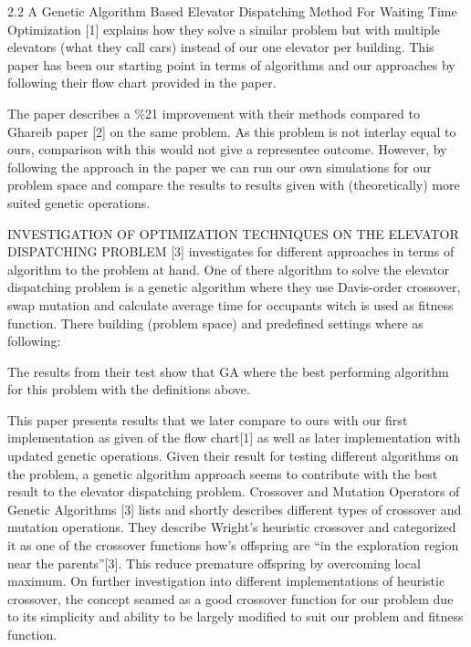 2.2 
A Genetic Algorithm Based Elevator Dispatching Method For Waiting Time Optimization [1] explains how they solve a similar problem but with multiple elevators (what they call cars) instead of our one elevator per building. This paper has been our starting point in terms of algorithms and our approaches by following their flow chart provided in the paper.  
 
The paper describes a \%21 improvement with their methods compared to Ghareib paper [2] on the same problem. As this problem is not interlay equal to ours, comparison with this would not give a representee outcome. However, by following the approach in the paper we can run our own simulations for our problem space and compare the results to results given with (theoretically) more suited genetic operations.

INVESTIGATION OF OPTIMIZATION TECHNIQUES ON THE ELEVATOR DISPATCHING PROBLEM [3] investigates for different approaches in terms of algorithm to the problem at hand.  One of there algorithm to solve the elevator dispatching problem is a genetic algorithm where they use Davis-order crossover, swap mutation and calculate average time for occupants  witch is used as fitness function. There building (problem space) and predefined settings where as following: 
  
The results from their test show that GA where the best performing algorithm for this problem with the definitions above. 
 
This paper presents results that we later compare to ours with our first implementation as given of the flow chart[1] as well as later implementation with updated genetic operations. Given their result for testing different algorithms on the problem, a genetic algorithm approach seems to contribute with the best result to the elevator dispatching problem.
Crossover and Mutation Operators of Genetic Algorithms [3] lists and shortly describes different types of crossover and mutation operations. They describe Wright's heuristic crossover and categorized it as one of the crossover functions how’s offspring are “in the exploration region near the parents”[3]. This reduce premature offspring by overcoming local maximum. On further investigation into different implementations of heuristic crossover, the concept seamed as a good crossover function for our problem due to its simplicity and ability to be largely modified to suit our problem and fitness function.


